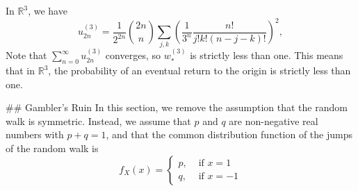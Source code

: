 In $\mathbb{R}^3$, we have 
$$\begin{equation}
    u_{2 n}^{(3)}=\frac{1}{2^{2 n}}\binom{2n}{n} \sum_{j, k}\left(\frac{1}{3^{n}} \frac{n !}{j ! k !(n-j-k) !}\right)^{2}, 
\end{equation}$$
Note that $\sum_{n=0}^{\infty} u_{2 n}^{(3)}$ converges, so $w_{*}^{(3)}$ is strictly less than one. This means that in $\mathbb{R}^3$, the probability of an eventual return to the origin is strictly less than one.


## Gambler’s Ruin
In this section, we remove the assumption that the random walk is symmetric. Instead, we assume that $p$ and $q$ are non-negative real numbers with $p + q = 1$, and that the common distribution function of the jumps of the random walk is
$$\begin{equation}
    f_{X}(x)=\left\{\begin{array}{ll}{p,} & {\text { if } x=1} \\ {q,} & {\text { if } x=-1}\end{array}\right.
\end{equation}$$


